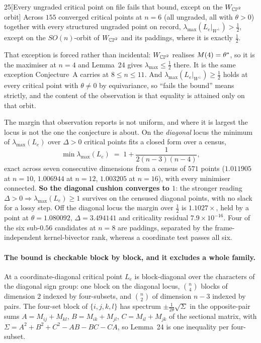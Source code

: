 \begin{Obs}{25}[Every ungraded critical point on file fails that bound, except on the $W_{\mathbb{CP}^2}$ orbit]
Across $155$ converged critical points at $n=6$ (all ungraded, all with $\theta>0$) together with every structured ungraded point on record, $\lambda_{\max}(L_e|_{W^\perp})>\tfrac12$, except on the $SO(n)$-orbit of $W_{\mathbb{CP}^2}$ and its paddings, where it is exactly $\tfrac12$.
\end{Obs}

That exception is forced rather than incidental: $W_{\mathbb{CP}^2}$ realises $M(4)=\theta^{*}$, so it is the maximiser at $n=4$ and Lemma~24 gives $\lambda_{\max}\le\tfrac12$ there. It is the same exception Conjecture~A carries at $8\le n\le11$. And $\lambda_{\max}(L_e|_{W^\perp})\ge\tfrac12$ holds at every critical point with $\theta\ne0$ by equivariance, so ``fails the bound'' means strictly, and the content of the observation is that equality is attained only on that orbit.

The margin that observation reports is not uniform, and where it is largest the locus is not the one the conjecture is about. On the \emph{diagonal} locus the minimum of $\lambda_{\max}(L_e)$ over $\Delta>0$ critical points fits a closed form over a census,
\[
\min\lambda_{\max}(L_e)\;=\;1+\frac1{2(n-3)(n-4)},
\]
exact across seven consecutive dimensions from a census of $571$ points ($1.011905$ at $n=10$, $1.006944$ at $n=12$, $1.003205$ at $n=16$), with every minimiser connected. \textbf{So the diagonal cushion converges to $1$}: the stronger reading $\Delta>0\Rightarrow\lambda_{\max}(L_e)\ge1$ survives on the censused diagonal points, with no slack for a lossy step. Off the diagonal locus the margin over $\tfrac12$ is $1.1027\times$, held by a point at $\theta=1.080092$, $\Delta=3.494141$ and criticality residual $7.9\times10^{-16}$. Four of the six sub-$0.56$ candidates at $n=8$ are paddings, separated by the frame-independent kernel-bivector rank, whereas a coordinate test passes all six.


\paragraph{The bound is checkable block by block, and it excludes a whole family.} At a coordinate-diagonal critical point $L_e$ is block-diagonal over the characters of the diagonal sign group: one block on the diagonal locus, $\binom n4$ blocks of dimension $2$ indexed by four-subsets, and $\binom n2$ of dimension $n-3$ indexed by pairs. The four-set block of $\{i,j,k,l\}$ has spectrum $\pm\tfrac1{2\theta}\sqrt\Sigma$ in the opposite-pair sums $A=M_{ij}+M_{kl}$, $B=M_{ik}+M_{jl}$, $C=M_{il}+M_{jk}$ of the sectional matrix, with $\Sigma=A^2+B^2+C^2-AB-BC-CA$, so Lemma~24 is one inequality per four-subset.

